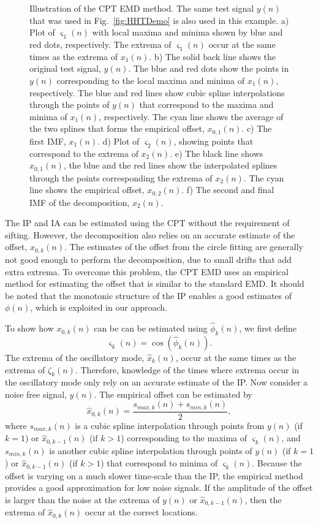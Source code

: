 \documentclass[a4paper]{IEEEtran}
\begin{document}
\begin{figure}[ht]
	\caption{Illustration of the CPT EMD method. The same test signal $y(n)$ that was used in Fig.~\ref{fig:HHTDemo} is also used in this example. a) Plot of $\varsigma_1(n)$ with local maxima and minima shown by blue and red dots, respectively. The extrema of $\varsigma_1(n)$ occur at the same times as the extrema of $x_1(n)$. b) The solid back line shows the original test signal, $y(n)$. The blue and red dots show the points in $y(n)$ corresponding to the local maxima and minima of $x_1(n)$, respectively. The blue and red lines show cubic spline interpolations through the points of $y(n)$ that correspond to the maxima and minima of $x_1(n)$, respectively. The cyan line shows the average of the two splines that forms the empirical offset, $x_{0,1}(n)$. c) The first IMF, $x_1(n)$. d) Plot of $\varsigma_2(n)$, showing points that correspond to the extrema of $x_2(n)$. e) The black line shows $x_{0,1}(n)$, the blue and the red lines show the interpolated splines through the points corresponding the extrema of $x_2(n)$. The cyan line shows the empirical offset, $x_{0,2}(n)$. f) The second and final IMF of the decomposition, $x_2(n)$.}
	\label{fig:CPT_EMD}
\end{figure}

The IP and IA can be estimated using the CPT without the requirement of sifting. However, the decomposition also relies on an accurate estimate of the offset, $x_{0,k}(n)$. The estimates of the offset from the circle fitting are generally not good enough to perform the decomposition, due to small drifts that add extra extrema. To overcome this problem, the CPT EMD uses an empirical method for estimating the offset that is similar to the standard EMD. It should be noted that the monotonic structure of the IP enables a good estimates of $\phi(n)$, which is exploited in our approach. 

To show how $x_{0,k}(n)$ can be can be estimated using $\hat\phi_k(n)$, we first define
\begin{equation}
	\varsigma_k(n)=\cos(\hat{\phi}_k(n)).
\end{equation}   
The extrema of the oscillatory mode, $\hat{x}_k(n)$, occur at the same times as the extrema of $\zeta_k(n)$. Therefore, knowledge of the times where extrema occur in the oscillatory mode only rely on an accurate estimate of the IP. Now consider a noise free signal, $y(n)$. The empirical offset can be estimated by 
\begin{equation}
    \hat{x}_{0,k}(n) = \frac{s_{max,k}(n) + s_{min,k}(n)}{2},
\end{equation}
where $s_{max,k}(n)$ is a cubic spline interpolation through points from $y(n)$ (if $k=1$) or $\hat{x}_{0,k-1}(n)$ (if $k>1$) corresponding to the maxima of $\varsigma_k(n)$, and $s_{min,k}(n)$ is another cubic spline interpolation through points of $y(n)$ (if $k=1$) or $\hat{x}_{0,k-1}(n)$ (if $k>1$) that correspond to minima of $\varsigma_k(n)$. Because the offset is varying on a much slower time-scale than the IP, the empirical method provides a good approximation for low noise signals. If the amplitude of the offset is larger than the noise at the extrema of $y(n)$ or $\hat{x}_{0,k-1}(n)$, then the extrema of $\hat{x}_{0,k}(n)$ occur at the correct locations.
\end{document}
